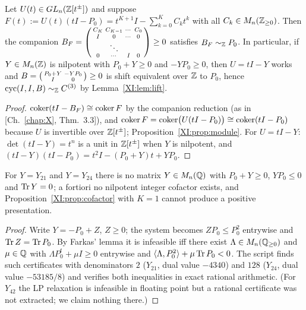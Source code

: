 \begin{proposition}\label{XI:prop:cofactor}
Let $U(t)\in GL_n(\mathbb{Z}[t^{\pm}])$ and suppose $F(t):=U(t)(tI-P_0)=t^{K+1}I-\sum_{k=0}^{K}C_kt^{k}$
with all $C_k\in M_n(\mathbb{Z}_{\ge0})$. Then the companion
$B_F=\begin{psmallmatrix}C_K&C_{K-1}&\cdots&C_0\\ I&0&\cdots&0\\ &\ddots&&\\ 0&\cdots&I&0
\end{psmallmatrix}\ge0$ satisfies $B_F\sim_{\mathbb{Z}} P_0$. In particular, if $Y\in M_n(\mathbb{Z})$ is
nilpotent with $P_0+Y\ge0$ and $-YP_0\ge0$, then $U=tI-Y$ works and
$B=\begin{psmallmatrix}P_0+Y&-YP_0\\ I&0\end{psmallmatrix}\ge0$ is shift equivalent over
$\mathbb{Z}$ to $P_0$, hence $\operatorname{cyc}(I,I,B)\sim_{\mathbb{Z}}C^{(3)}$ by Lemma~\ref{XI:lem:lift}.
\end{proposition}

\begin{proof}
$\operatorname{coker}(tI-B_F)\cong\operatorname{coker} F$ by the companion reduction (as in [Ch.~\ref{chap:X}, Thm.~3.3]), and
$\operatorname{coker} F=\operatorname{coker}\bigl(U(tI-P_0)\bigr)\cong\operatorname{coker}(tI-P_0)$ because $U$ is invertible over
$\mathbb{Z}[t^{\pm}]$; Proposition~\ref{XI:prop:module}. For $U=tI-Y$: $\det(tI-Y)=t^{n}$ is a unit in
$\mathbb{Z}[t^{\pm}]$ when $Y$ is nilpotent, and $(tI-Y)(tI-P_0)=t^{2}I-(P_0+Y)t+YP_0$.
\end{proof}

\begin{theorem}\label{XI:thm:nocofactor}
For $Y=Y_{21}$ and $Y=Y_{24}$ there is no matrix $Y\in M_n(\mathbb{Q})$ with $P_0+Y\ge0$,
$YP_0\le0$ and $\operatorname{Tr} Y=0$; a fortiori no nilpotent integer cofactor exists, and
Proposition~\ref{XI:prop:cofactor} with $K=1$ cannot produce a positive presentation.
\end{theorem}

\begin{proof}
Write $Y=-P_0+Z$, $Z\ge0$; the system becomes $ZP_0\le P_0^{2}$ entrywise and $\operatorname{Tr} Z=\operatorname{Tr} P_0$.
By Farkas' lemma it is infeasible iff there exist $\Lambda\in M_n(\mathbb{Q}_{\ge0})$ and $\mu\in\mathbb{Q}$
with $\Lambda P_0^{t}+\mu I\ge0$ entrywise and $\langle\Lambda,P_0^{2}\rangle+\mu\operatorname{Tr} P_0<0$.
The script finds such certificates with denominators $2$ ($Y_{21}$, dual value $-4340$) and
$128$ ($Y_{24}$, dual value $-53185/8$) and verifies both inequalities in exact rational
arithmetic. (For $Y_{42}$ the LP relaxation is infeasible in floating point but a rational
certificate was not extracted; we claim nothing there.)
\end{proof}


